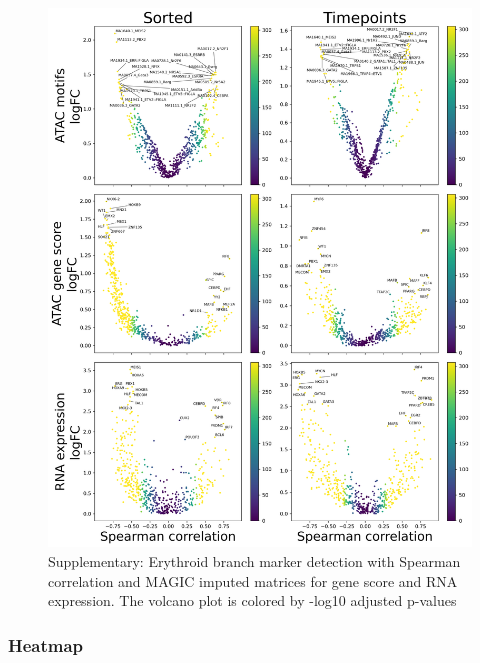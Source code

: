 \documentclass[a4paper]{article}
\begin{document}
\begin{figure}[!htb]
  \centering
  \includegraphics[width=\textwidth]{../figures/hematopoiesis/Myeloid DC_40_107_smooth_magic_single_branch_volcanos_motifs.png}
  \caption{Supplementary: Erythroid branch marker detection with Spearman correlation and MAGIC imputed matrices for gene score and RNA expression. The volcano plot is colored by -log10 adjusted p-values}
\end{figure}

\FloatBarrier
\subsubsection{Heatmap}
\end{document}
